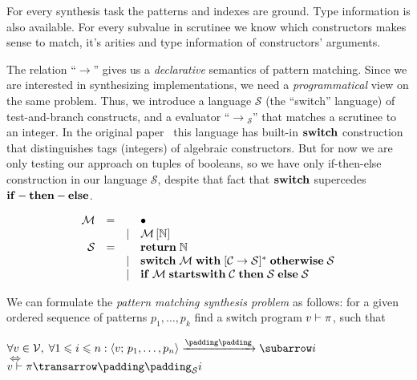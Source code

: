 For every synthesis task the patterns and indexes are ground. Type information is also available. For every subvalue in scrutinee we know which constructors makes sense to match, it's arities and type information of constructors' arguments.

The relation ``$\xrightarrow{}{}\!\!$'' gives us a \emph{declarative} semantics of pattern matching. Since we are interested in
synthesizing implementations, we need a \emph{programmatical} view on the same problem. Thus, we introduce a language $\mathcal S$
(the ``switch'' language) of test-and-branch constructs, and a evaluator ``$\xrightarrow{}{}_{\!\!\mathcal S}$'' that matches a scrutinee to an integer. 
In the original paper~\cite{Kosarev2020} this language has built-in $\mathbf{switch}$ construction that distinguishes tags (integers) of algebraic constructors. But for now we are only testing our approach on tuples of booleans, so we have only if-then-else construction in our language $\mathcal{S}$, despite that fact that $\mathbf{switch}$ supercedes $\mathbf{if-then-else}$.

\[
\begin{array}{rccl}
  \mathcal M & = &       & \bullet \\
             &   & \mid  & \mathcal M\,[\mathbb{N}] \\
  \mathcal{S}        & = &       & \mathbf{return}\;\mathbb{N} \\
             &   & \mid  & \mathbf{switch}\;\mathcal{M}\;\mathbf{with}\; [\mathcal{C}\; \mathbf{\rightarrow}\; \mathcal{S}]^*\;\mathbf{otherwise}\;\mathcal{S}\\
             &   & \mid  & \mathbf{if}\;\mathcal{M}\;\mathbf{starts with}\;\mathcal{C}\;\mathbf{then}\; \mathcal{S}\;\mathbf{else}\;\mathcal{S}
\end{array}
\]

We can formulate the \emph{pattern matching synthesis problem} as follows: for a given ordered sequence of patterns $p_1,\dots,p_k$ find
a switch program ${v}\vdash{\pi}$, such that

\begin{center}
$\setarrow{\xrightarrow}
\forall v\in \mathcal V,\; \forall 1\leqslant i\leqslant n: \trans{\inbr{v;\,p_1,\dots,p_n}}{}{i}$\\
$\Longleftrightarrow$ \\ 
$\setsubarrow{_{\mathcal S}}\withenv{v}{\trans{\pi}{}{i}}$ \\
\end{center}


